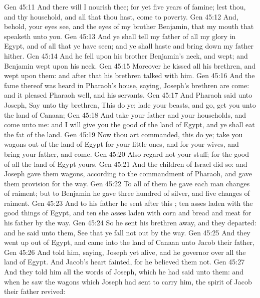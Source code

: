 \vs Gen 45:11 And there will I nourish thee; for yet  five years of famine; lest thou, and thy household, and all that thou hast, come to poverty.
\vs Gen 45:12 And, behold, your eyes see, and the eyes of my brother Benjamin, that  my mouth that speaketh unto you.
\vs Gen 45:13 And ye shall tell my father of all my glory in Egypt, and of all that ye have seen; and ye shall haste and bring down my father hither.
\vs Gen 45:14 And he fell upon his brother Benjamin's neck, and wept; and Benjamin wept upon his neck.
\vs Gen 45:15 Moreover he kissed all his brethren, and wept upon them: and after that his brethren talked with him.
\vs Gen 45:16 And the fame thereof was heard in Pharaoh's house, saying, Joseph's brethren are come: and it pleased Pharaoh well, and his servants.
\vs Gen 45:17 And Pharaoh said unto Joseph, Say unto thy brethren, This do ye; lade your beasts, and go, get you unto the land of Canaan;
\vs Gen 45:18 And take your father and your households, and come unto me: and I will give you the good of the land of Egypt, and ye shall eat the fat of the land.
\vs Gen 45:19 Now thou art commanded, this do ye; take you wagons out of the land of Egypt for your little ones, and for your wives, and bring your father, and come.
\vs Gen 45:20 Also regard not your stuff; for the good of all the land of Egypt  yours.
\vs Gen 45:21 And the children of Israel did so: and Joseph gave them wagons, according to the commandment of Pharaoh, and gave them provision for the way.
\vs Gen 45:22 To all of them he gave each man changes of raiment; but to Benjamin he gave three hundred  of silver, and five changes of raiment.
\vs Gen 45:23 And to his father he sent after this ; ten asses laden with the good things of Egypt, and ten she asses laden with corn and bread and meat for his father by the way.
\vs Gen 45:24 So he sent his brethren away, and they departed: and he said unto them, See that ye fall not out by the way.
\vs Gen 45:25 And they went up out of Egypt, and came into the land of Canaan unto Jacob their father,
\vs Gen 45:26 And told him, saying, Joseph  yet alive, and he  governor over all the land of Egypt. And Jacob's heart fainted, for he believed them not.
\vs Gen 45:27 And they told him all the words of Joseph, which he had said unto them: and when he saw the wagons which Joseph had sent to carry him, the spirit of Jacob their father revived:
